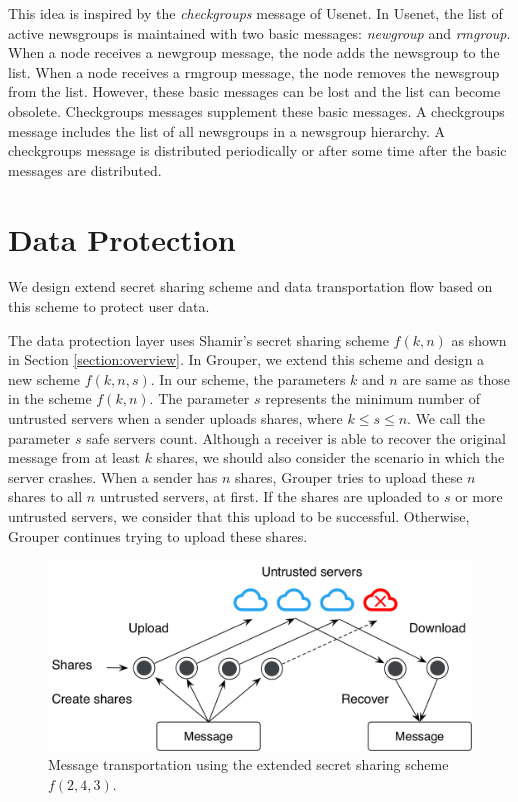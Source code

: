 \documentclass[a4paper,11pt]{report}
\begin{document}
This idea is inspired by the \emph{checkgroups} message of Usenet\cite{usenet}.
In Usenet, the list of active newsgroups is maintained with two basic messages: \emph{newgroup} and \emph{rmgroup}.
When a node receives a newgroup message, the node adds the newsgroup to the list.
When a node receives a rmgroup message, the node removes the newsgroup from the list.
However, these basic messages can be lost and the list can become obsolete.
Checkgroups messages supplement these basic messages.
A checkgroups message includes the list of all newsgroups in a newsgroup hierarchy.
A checkgroups message is distributed periodically or after some time after the basic messages are distributed.

\section{Data Protection}  \label{section:data_protection}

We design extend secret sharing scheme and data transportation flow based on this scheme to protect user data.

The data protection layer uses Shamir's secret sharing scheme $f(k, n)$ as shown in Section \ref{section:overview}.
In Grouper, we extend this scheme and design a new scheme $ f(k, n, s)$.
In our scheme, the parameters $k$ and $n$ are same as those in the scheme $f(k, n)$. 
The parameter $s$ represents the minimum number of untrusted servers when a sender uploads shares, where $k \leq s \leq n$.
We call the parameter $s$ safe servers count.
Although a receiver is able to recover the original message from at least $k$ shares, we should also consider the scenario in which the server crashes. 
When a sender has $n$ shares, Grouper tries to upload these $n$ shares to all $n$ untrusted servers, at first. 
If the shares are uploaded to $s$ or more untrusted servers, we consider that this upload to be successful.
Otherwise, Grouper continues trying to upload these shares.

\begin{figure}[t]
	\centering
	\includegraphics[scale=0.65]{transportation}
	\caption{Message transportation using the extended secret sharing scheme $f(2, 4, 3)$.}
	\label{fig:transportation}
\end{figure}
\end{document}
